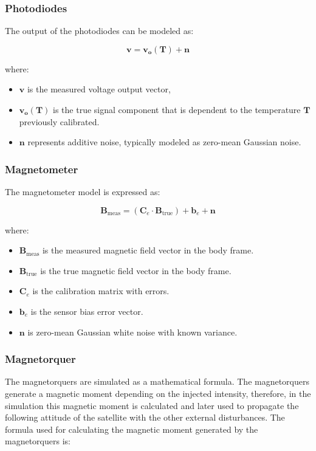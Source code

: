 \subsubsection{Photodiodes}

The output of the photodiodes can be modeled as:

\begin{equation}
    \boldsymbol{v} = \boldsymbol{v_o(T)} + \boldsymbol{n}
\end{equation}

where:
\begin{itemize}
    \item $\boldsymbol{v}$ is the measured voltage output vector,
    \item $\boldsymbol{v_o(T)}$ is the true signal component that is dependent to the temperature $\boldsymbol{T}$ previously calibrated.
    \item $\boldsymbol{n}$ represents additive noise, typically modeled as zero-mean Gaussian noise.
\end{itemize}

\subsubsection{Magnetometer}

The magnetometer model is expressed as:

\begin{equation}
\boldsymbol{B}_{\text{meas}} = \left( \mathbf{C}_e \cdot \boldsymbol{B}_{\text{true}} \right) + \boldsymbol{b}_e + \boldsymbol{n}
\end{equation}

where:

\begin{itemize}
    \item $\boldsymbol{B}_{\text{meas}}$ is the measured magnetic field vector in the body frame.
    \item $\boldsymbol{B}_{\text{true}}$ is the true magnetic field vector in the body frame.
    \item $\mathbf{C}_e$ is the calibration matrix with errors.
    \item $\boldsymbol{b}_e$ is the sensor bias error vector.
    \item $\boldsymbol{n}$ is zero-mean Gaussian white noise with known variance.
\end{itemize}

\subsubsection{Magnetorquer}
The magnetorquers are simulated as a mathematical formula. The magnetorquers generate a magnetic moment depending on the injected intensity, therefore,
in the simulation this magnetic moment is calculated and later used to propagate the following attitude of the satellite with the other external disturbances.
The formula used for calculating the magnetic moment generated by the magnetorquers is:

